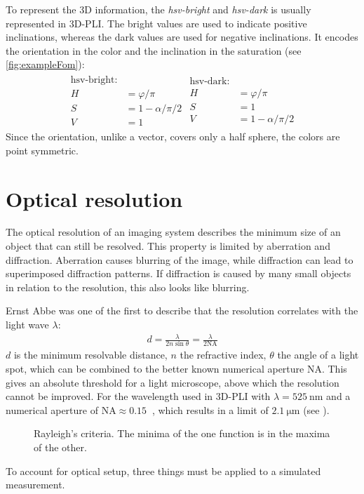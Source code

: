 To represent the 3D information, the \textit{hsv-bright} and \textit{hsv-dark} is usually represented in \ac{3D-PLI}. The bright values are used to indicate positive inclinations, whereas the dark values are used for negative inclinations.
It encodes the orientation in the color and the inclination in the saturation (see \cref{fig:exampleFom}):
\begin{align}
\begin{split}
    \text{hsv-bright:}\\
    H &= \varphi/\pi\\
    S &= 1-\alpha / \pi/2\\
    V &= 1
\end{split}
\begin{split}
    \text{hsv-dark:}\\
    H &= \varphi/\pi\\
    S &= 1\\
    V &= 1-\alpha / \pi/2
\end{split}
\end{align}
Since the orientation, unlike a vector, covers only a half sphere, the colors are point symmetric.
%
%
\section{Optical resolution}
\label{sec:opticalResolution}
%
The optical resolution of an imaging system describes the minimum size of an object that can still be resolved.
This property is limited by aberration and diffraction.
Aberration causes blurring of the image, while diffraction can lead to superimposed diffraction patterns.
If diffraction is caused by many small objects in relation to the resolution, this also looks like blurring.
\par
%
Ernst Abbe was one of the first to describe that the resolution correlates with the light wave $\lambda$:
\begin{align}
d=\frac{ \lambda}{2 n \sin \theta} = \frac{\lambda}{2\mathrm{NA}} 
\end{align}
$d$ is the minimum resolvable distance, $n$ the refractive index, $\theta$ the angle of a light spot, which can be combined to the better known numerical aperture $\mathrm{NA}$.
This gives an absolute threshold for a light microscope, above which the resolution cannot be improved.
For the wavelength used in \ac{3D-PLI} with $\lambda = \SI{525}{\nano\meter}$ and a numerical aperture of $\mathrm{NA} \approx \SI{0.15}{}$ , which results in a limit of $\SI{2.1}{\micro\meter}$ (see \cite{MenzelDissertation}).
%
\begin{figure}[!t]
\setlength{\tikzwidth}{0.45\textwidth}
\centering
\caption[Raylay criterium]{Rayleigh's criteria. The minima of the one function is in the maxima of the other.}
\label{fig:rayleigh}
\end{figure}
%
To account for optical setup, three things must be applied to a simulated measurement.
%
